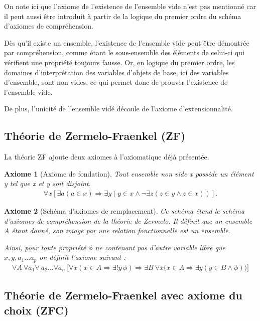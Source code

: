\documentclass[10pt,a4paper]{article}
\newtheorem{axiom}{Axiome}[section]
\begin{document}
{On note ici que l'axiome de l'existence de l'ensemble vide n'est pas mentionné car il peut aussi être introduit à partir de la logique du premier ordre du schéma d'axiomes de compréhension.

Dès qu'il existe un ensemble, l'existence de l'ensemble vide peut être démontrée par compréhension, comme étant le sous-ensemble des éléments de celui-ci qui vérifient une propriété toujours fausse.
Or, en logique du premier ordre, les domaines d'interprétation des variables d'objets de base, ici des variables d'ensemble, sont non vides, ce qui permet donc de prouver l'existence de l'ensemble vide.

De plus, l'unicité de l'ensemble vidé découle de l'axiome d'extensionnalité.

\subsection{Théorie de Zermelo-Fraenkel (ZF)}

La théorie ZF ajoute deux axiomes à l'axiomatique déjà présentée.

\begin{axiom}[Axiome de fondation] Tout ensemble non vide x possède un élément y tel que x et y soit disjoint.
\begin{align}
\forall x [ \exists a ( a \in x) \Rightarrow \exists y ( y \in x \land \lnot \exists z (z \in y \land z \in x))]. 
\end{align}
\end{axiom}

\begin{axiom}[Schéma d'axiomes de remplacement] Ce schéma étend le schéma d'axiomes de compréhension de la théorie de Zermelo. Il définit que un ensemble A étant donné, son image par une relation fonctionnelle est un ensemble.

Ainsi, pour toute propriété $\phi$ ne contenant pas d'autre variable libre que $x, y, a_1 \ldots a_p$ on définit l'axiome suivant :
\begin{align}
\forall A \ \forall a_1 \forall \ a_2 \ldots \forall a_n \ 
\bigl[ \forall x ( x\in A \Rightarrow \exists! y\,\phi ) \Rightarrow \exists B \ \forall x \bigl(x\in A \Rightarrow \exists y (y\in B \land \phi) \bigr) \bigr]
\end{align}
\end{axiom}

\subsection{Théorie de Zermelo-Fraenkel avec axiome du choix (ZFC)}

}
\end{document}

